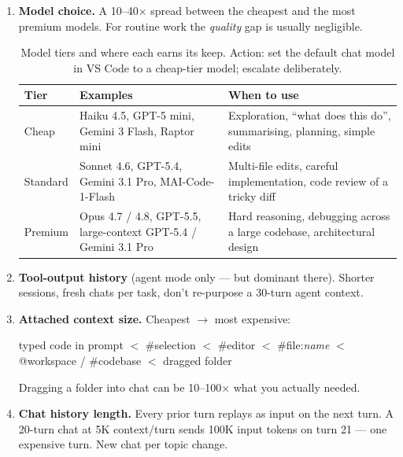 \documentclass[11pt,a4paper]{article}
\begin{document}
\begin{enumerate}[label=\textbf{\arabic*.}]
  \item \textbf{Model choice.} A 10--40$\times$ spread between the cheapest and the most premium models. For routine work the \emph{quality} gap is usually negligible.

  \begin{table}[h]
  \centering\footnotesize
  \begin{tabular}{@{}L{1.6cm}L{4.8cm}L{6.6cm}@{}}
  \toprule
  \textbf{Tier} & \textbf{Examples} & \textbf{When to use} \\
  \midrule
  Cheap    & Haiku 4.5, GPT-5 mini, Gemini 3 Flash, Raptor mini & Exploration, ``what does this do'', summarising, planning, simple edits \\
  Standard & Sonnet 4.6, GPT-5.4, Gemini 3.1 Pro, MAI-Code-1-Flash & Multi-file edits, careful implementation, code review of a tricky diff \\
  Premium  & Opus 4.7 / 4.8, GPT-5.5, large-context GPT-5.4 / Gemini 3.1 Pro & Hard reasoning, debugging across a large codebase, architectural design \\
  \bottomrule
  \end{tabular}
  \caption{Model tiers and where each earns its keep. Action: set the default chat model in VS Code to a cheap-tier model; escalate deliberately.}
  \end{table}

  \item \textbf{Tool-output history} (agent mode only --- but dominant there). Shorter sessions, fresh chats per task, don't re-purpose a 30-turn agent context.

  \item \textbf{Attached context size.} Cheapest $\rightarrow$ most expensive:
    \begin{center}\small\ttfamily
      typed code in prompt $<$ \#selection $<$ \#editor $<$ \#file:\textit{name} $<$ @workspace / \#codebase $<$ dragged folder
    \end{center}
    Dragging a folder into chat can be 10--100$\times$ what you actually needed.

  \item \textbf{Chat history length.} Every prior turn replays as input on the next turn. A 20-turn chat at 5K context/turn sends 100K input tokens on turn 21 --- one expensive turn. New chat per topic change.
\end{enumerate}

\end{document}
